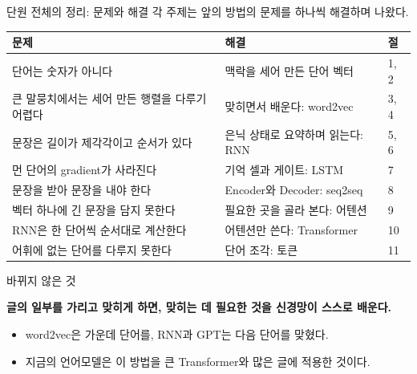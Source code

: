 \documentclass[aspectratio=169,11pt]{beamer}
\begin{document}
\begin{frame}{단원 전체의 정리: 문제와 해결}
각 주제는 앞의 방법의 문제를 하나씩 해결하며 나왔다.
\begin{center}
\small
\begin{tabular}{@{}p{64mm}p{58mm}l@{}}
\toprule
문제 & 해결 & 절 \\
\midrule
단어는 숫자가 아니다 & 맥락을 세어 만든 단어 벡터 & 1, 2 \\
큰 말뭉치에서는 세어 만든 행렬을 다루기 어렵다 & 맞히면서 배운다: word2vec & 3, 4 \\
문장은 길이가 제각각이고 순서가 있다 & 은닉 상태로 요약하며 읽는다: RNN & 5, 6 \\
먼 단어의 gradient가 사라진다 & 기억 셀과 게이트: LSTM & 7 \\
문장을 받아 문장을 내야 한다 & Encoder와 Decoder: seq2seq & 8 \\
벡터 하나에 긴 문장을 담지 못한다 & 필요한 곳을 골라 본다: 어텐션 & 9 \\
RNN은 한 단어씩 순서대로 계산한다 & 어텐션만 쓴다: Transformer & 10 \\
어휘에 없는 단어를 다루지 못한다 & 단어 조각: 토큰 & 11 \\
\bottomrule
\end{tabular}
\end{center}
\end{frame}

\begin{frame}{바뀌지 않은 것}
\begin{keybox}
\textbf{글의 일부를 가리고 맞히게 하면, 맞히는 데 필요한 것을 신경망이 스스로 배운다.}
\end{keybox}
\vskip2mm
\begin{itemize}
\item word2vec은 가운데 단어를, RNN과 GPT는 다음 단어를 맞혔다.
\item 지금의 언어모델은 이 방법을 큰 Transformer와 많은 글에 적용한 것이다.
\end{itemize}
\end{frame}
\end{document}
